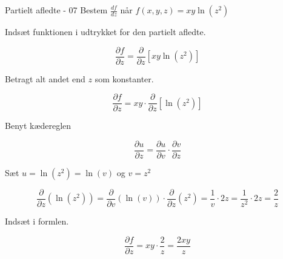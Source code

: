 \documentclass{article}
\begin{document}
\begin{exercise}{Partielt afledte - 07}
Bestem $\frac{df}{dz}$ når $f(x,y,z) = xy \ln(z^2)$


\hint
Indsæt funktionen i udtrykket for den partielt afledte.

\hint

\[
\frac{\partial f}{\partial z} = \frac{\partial }{\partial z} \left[ xy \ln(z^2) \right]
\]

\hint

Betragt alt andet end $z$ som konstanter.

\hint
\[
\frac{\partial f}{\partial z} = xy \cdot \frac{\partial }{\partial z} \left[\ln(z^2) \right]
\]

\hint
Benyt kædereglen

\hint
\[
\frac{\partial u}{\partial z} = \frac{\partial u}{\partial v} \cdot \frac{\partial v}{\partial z}
\]

\hint
Sæt $u=\ln(z^2) = \ln(v)$ og $v = z^2$

\hint
\[
\frac{\partial}{\partial z} \left( \ln(z^2)\right) = \frac{\partial}{\partial v} \left( \ln(v) \right) \cdot \frac{\partial}{\partial z} (z^2) = \frac{1}{v} \cdot 2z = \frac{1}{z^2} \cdot 2z = \frac{2}{z}
\]

\hint
Indsæt i formlen.

\hint
\[
\frac{\partial f}{\partial z} = xy \cdot \frac{2}{z} = \frac{2xy}{z}
\]


\end{exercise}

\newpage
\end{document}
